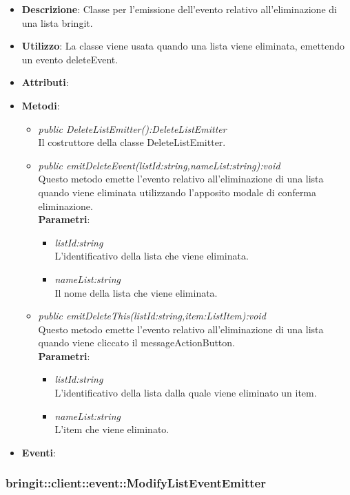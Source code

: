 \begin{itemize}
\item \textbf{Descrizione}: Classe per l'emissione dell'evento relativo all'eliminazione di una lista bringit.
\item \textbf{Utilizzo}: La classe viene usata quando una lista viene eliminata, emettendo un evento deleteEvent.
\item \textbf{Attributi}: 
\item \textbf{Metodi}:
	\begin{itemize}
	\item \textit{public DeleteListEmitter():DeleteListEmitter}\\
	Il costruttore della classe DeleteListEmitter.
	\item \textit{public emitDeleteEvent(listId:string,nameList:string):void}\\
	Questo metodo emette l'evento relativo all'eliminazione di una lista quando viene eliminata utilizzando l'apposito modale di conferma eliminazione.
					\\ \textbf{Parametri}: \begin{itemize}
			\item \textit{listId:string}\\
			L'identificativo della lista che viene eliminata.
			\item \textit{nameList:string}\\
			Il nome della lista che viene eliminata.
					\end{itemize}
					
	\item \textit{public emitDeleteThis(listId:string,item:ListItem):void}\\
	Questo metodo emette l'evento relativo all'eliminazione di una lista quando viene cliccato il messageActionButton.
					\\ \textbf{Parametri}: \begin{itemize}
			\item \textit{listId:string}\\
			L'identificativo della lista dalla quale viene eliminato un item.
			\item \textit{nameList:string}\\
			L'item che viene eliminato.
					\end{itemize}
	\end{itemize}
\item \textbf{Eventi}:
\end{itemize}

\subsubsection{bringit::client::event::ModifyListEventEmitter}

